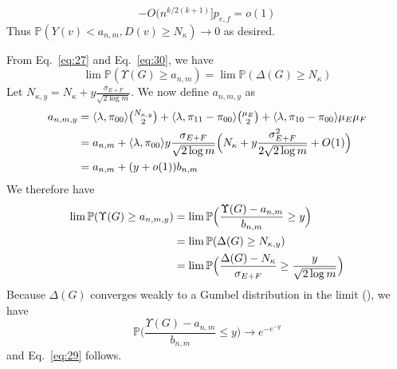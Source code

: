 \documentclass[final]{IEEEtran}
\theoremstyle{definition}
\begin{document}
\begin{IEEEproof}
\begin{IEEEproof}[Eq.~\eqref{eq:30}]
\begin{equation}
    - O(n^{k/2(k+1)}\Bigr] p_{e,f} = o(1)
  \end{equation}
  Thus $\mathbb{P}(Y(v) < a_{n,m}, D(v) \geq
      N_{\kappa}) \rightarrow 0$ as desired.
\end{IEEEproof}
From Eq.~\eqref{eq:27} and Eq.~\eqref{eq:30}, we have
\begin{equation}
  \label{eq:40}
 \lim
\mathbb{P}(\Upsilon(G) \geq a_{n,m}) = \lim \mathbb{P}(\Delta(G) \geq
N_{\kappa})
 \end{equation}
Let $N_{\kappa,y} = N_\kappa + y \tfrac{\sigma_{E+F}}{\sqrt{2
    \log{m}}}$. We now define $a_{n,m,y}$ as 
\begin{equation}
  \label{eq:18}
  \begin{split}a_{n,m,y} &= \langle \lambda, \pi_{00} \rangle
    \tbinom{N_{\kappa,y}}{2} +
  \langle \lambda, \pi_{11} - \pi_{00} \rangle \tbinom{\mu_E}{2}  +
  \langle \lambda, \pi_{10} - \pi_{00} \rangle \mu_E \mu_F \\
  &= a_{n,m} + \langle \lambda, \pi_{00} \rangle y
  \frac{\sigma_{E+F}}{\sqrt{2 \log m}} \Bigl(N_{\kappa} + y
  \frac{\sigma_{E+F}^{2}}{2 \sqrt{2 \log{m}}} + O(1) \Bigr) \\
  &= a_{n,m} + (y + o(1)) b_{n,m} 
  \end{split}
\end{equation}
We therefore have
\begin{equation}
  \label{eq:43}
  \begin{split}
  \lim \mathbb{P}(\Upsilon(G) \geq a_{n,m,y}) &= 
  \lim \mathbb{P}\Bigl(\frac{\Upsilon(G) - a_{n,m}}{b_{n,m}} \geq y \Bigr) \\
  &= \lim \mathbb{P}(\Delta(G) \geq N_{\kappa,y}) \\
  &= \lim \mathbb{P}\Bigl(\frac{\Delta(G) -
    N_{\kappa}}{\sigma_{E+F}} \geq \frac{y}{\sqrt{2 \log{m}}} \Bigr) \\
  \end{split}
\end{equation}
Because $\Delta(G)$ converges weakly to a Gumbel
distribution in the limit
(\cite{bollobas85:_random_graph,rukhin:_limit_distr_graph_scan_statis}),
we have
\begin{equation}
  \label{eq:47}
  \mathbb{P}\Big(\frac{\Upsilon(G) - a_{n,m}}{b_{n,m}} \leq
    y\Bigr) \rightarrow e^{- e^{-y}} 
\end{equation}
and Eq.~\eqref{eq:29} follows.
\end{IEEEproof}

\end{document}
